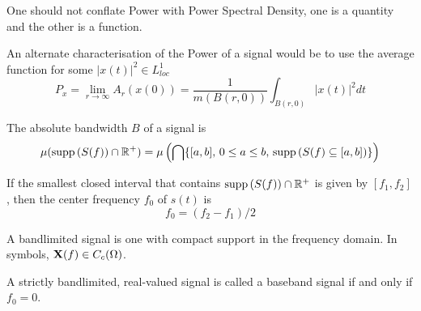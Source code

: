 \documentclass[../../main.tex]{subfiles}
\begin{document}
\begin{remark}
    One should not conflate Power with Power Spectral Density, one is a quantity and the other is a function.
\end{remark}
An alternate characterisation of the Power of a signal would be to use the average function for some $|x(t)|^2\in L^1_{loc}$
\[
P_x=\lim_{r\to\infty}A_r(x(0))=\dfrac{1}{m(B(r,0))}\int_{B(r,0)}|x(t)|^2dt
\]
\begin{definition}
    The absolute bandwidth $B$ of a signal is 
    \[
    \mu(\operatorname{supp}{(S(f))}\cap\mathbb{R}^+)=\mu\left(\bigcap\{[a,b],\,0\leq a\leq b,\,\operatorname{supp}{(S(f)\subseteq[a,b])}\}\right)
    \]
\end{definition}
\begin{definition}
    If the smallest closed interval that contains $\operatorname{supp}{(S(f))}\cap\mathbb{R}^+$ is given by $[f_1,f_2]$, then the center frequency $f_0$ of $s(t)$ is
    \[
    f_0 = (f_2-f_1)/2
    \]
\end{definition}
\begin{definition}
    A bandlimited signal is one with compact support in the frequency domain. In symbols, $\mathbf{X}(f)\in C_c(\Omega)$.
\end{definition}
\begin{definition}
    A strictly bandlimited, real-valued signal is called a baseband signal if and only if $f_0=0$.
\end{definition}
\begin{wtr}

\end{wtr}
\end{document}
